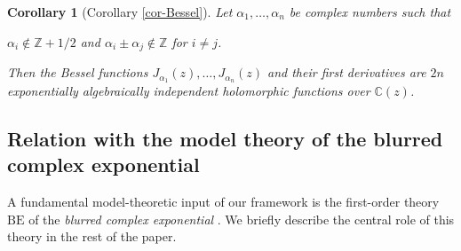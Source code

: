 \documentclass[12pt]{amsart}
\newcommand{\BE}{\mathrm{BE}}
\theoremstyle{definition}
\theoremstyle{plain}
\theoremstyle{exampstyle}\newtheorem{thmx}{Theorem}
\theoremstyle{exampstyle}\newtheorem{thmxbis}{Theorem}
\newtheorem*{corx}{Corollary}
\begin{document}
\begin{corx}[Corollary \ref{cor-Bessel}]
Let $\alpha_1,\ldots, \alpha_n$ be complex numbers such that 
\begin{center} 
$\alpha_i \notin \mathbb{Z} + 1/2$ and $\alpha_i \pm \alpha_j \notin \mathbb{Z}$ for $i \neq j$. 
\end{center} 
Then the Bessel functions $J_{\alpha_1}(z), \ldots, J_{\alpha_n}(z)$
 and their first derivatives are $2n$ {\em exponentially algebraically independent} holomorphic functions over $\mathbb{C}(z)$. 
\end{corx} 


\subsection{Relation with the model theory of the blurred complex exponential} A fundamental model-theoretic input of our framework is the first-order theory $\BE$ of the {\em blurred complex exponential} \cite{Kirby-semiab,Kirby-blurred}. We briefly describe the central role of this theory in the rest of the paper.
\end{document}

